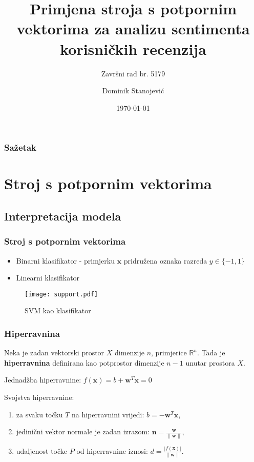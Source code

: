 \documentclass[utf8]{beamer}
\title[Primjena SVM-a za analizu sentimenta]
{Primjena stroja s potpornim vektorima za analizu sentimenta korisničkih recenzija}
\subtitle{Završni rad br. 5179}
\author{Dominik Stanojević}
\institute[FER]
{Sveučilište u Zagrebu, Fakultet elektrotehnike i računarstva}
\date{\today}
\begin{document}
\begin{frame}
\titlepage
\end{frame}
    
\begin{frame}
\frametitle{Sažetak}
\tableofcontents
\end{frame}
    
\section{Stroj s potpornim vektorima}
    
\subsection{Interpretacija modela}

\begin{frame}
\frametitle{Stroj s potpornim vektorima}
\begin{itemize}
\item Binarni klasifikator - primjerku $\mathbf{x}$ pridružena oznaka razreda $y \in \{-1, 1\}$
\item Linearni klasifikator
\end{itemize}
\begin{figure}
\texttt{[image: support.pdf]}
\caption{SVM kao klasifikator}
\end{figure}
\end{frame}	    

\begin{frame}
\frametitle{Hiperravnina}
Neka je zadan vektorski prostor $\textit{X}$ dimenzije $n$, primjerice $\mathbb{R}^n$.
Tada je \textbf{hiperravnina} definirana kao potprostor dimenzije $n-1$ unutar prostora $\textit{X}$.

\begin{block}{Jednadžba hiperravnine:}
$f(\mathbf{x})=b + \mathbf{w}^T\mathbf{x} = 0$
\end{block}

Svojstva hiperravnine:
\begin{enumerate}
  \item za svaku točku $T$ na hiperravnini vrijedi: $b = -\mathbf{w}^T\mathbf{x}$,
  \item jedinični vektor normale je zadan izrazom: $\mathbf{n} = \frac{\mathbf{w}}{\|\mathbf{w}\|}$,
  \item udaljenost točke $P$ od hiperravnine iznosi: $d = \frac{|f(\mathbf{x})|}{\|\mathbf{w}\|}$.
\end{enumerate}
\end{frame}
\end{document}
